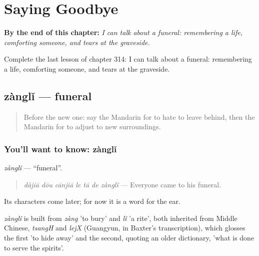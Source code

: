 
\chapter{Saying Goodbye}
\label{ch:zh-saying-goodbye}

\begin{chapteropening}
\textbf{By the end of this chapter:} \emph{I can talk about a funeral: remembering a life, comforting someone, and tears at the graveside.}

Complete the last lesson of chapter 314: I can talk about a funeral: remembering a life, comforting someone, and tears at the graveside.
\end{chapteropening}

\section[zànglǐ]{zànglǐ — funeral}

\label{lesson:ZH-C314-zangli}



\begin{quote}
Before the new one: say the Mandarin for to hate to leave behind, then the Mandarin for to adjust to new surroundings.
\end{quote}

\subsection*{You'll want to know: zànglǐ}
\emph{zànglǐ} — \textquotedblleft{}funeral\textquotedblright{}.

\begin{quote}
\emph{dàjiā dōu cānjiā le tā de zànglǐ} — Everyone came to his funeral.
\end{quote}

Its characters come later; for now it is a word for the ear.

\begin{cousinweb}
\emph{zànglǐ} is built from \emph{zàng} 'to bury' and \emph{lǐ} 'a rite', both inherited from Middle Chinese, \emph{tsangH} and \emph{lejX} (Guangyun, in Baxter's transcription), which glosses the first 'to hide away' and the second, quoting an older dictionary, 'what is done to serve the spirits'.
\end{cousinweb}

